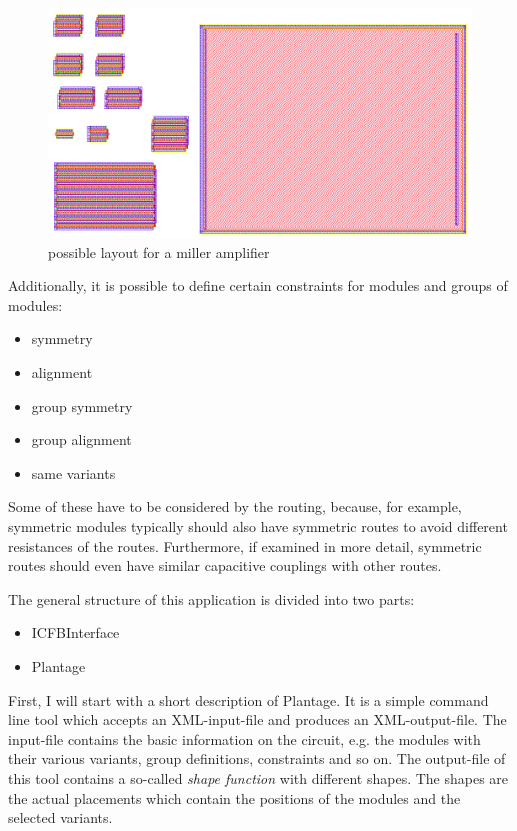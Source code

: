 \begin{figure}
	\centering
	\includegraphics[scale=0.4]{FIG/miller_amplifier_layout.png}
	\caption{possible layout for a miller amplifier}
	\label{fig:miller_amplifier_layout}
\end{figure}

Additionally, it is possible to define certain constraints for modules and groups of modules:
\begin{itemize}
\item symmetry
\item alignment
\item group symmetry
\item group alignment
\item same variants
\end{itemize}

Some of these have to be considered by the routing, because, for example, symmetric modules typically should also have symmetric routes to avoid different resistances of the routes. Furthermore, if examined in more detail, symmetric routes should even have similar capacitive couplings with other routes.

The general structure of this application is divided into two parts:
\begin{itemize}
\item ICFBInterface
\item Plantage
\end{itemize}

First, I will start with a short description of Plantage. It is a simple command line tool which accepts an XML-input-file and produces an XML-output-file. The input-file contains the basic information on the circuit, e.g. the modules with their various variants, group definitions, constraints and so on. The output-file of this tool contains a so-called \emph{shape function} with different shapes. The shapes are the actual placements which contain the positions of the modules and the selected variants.

